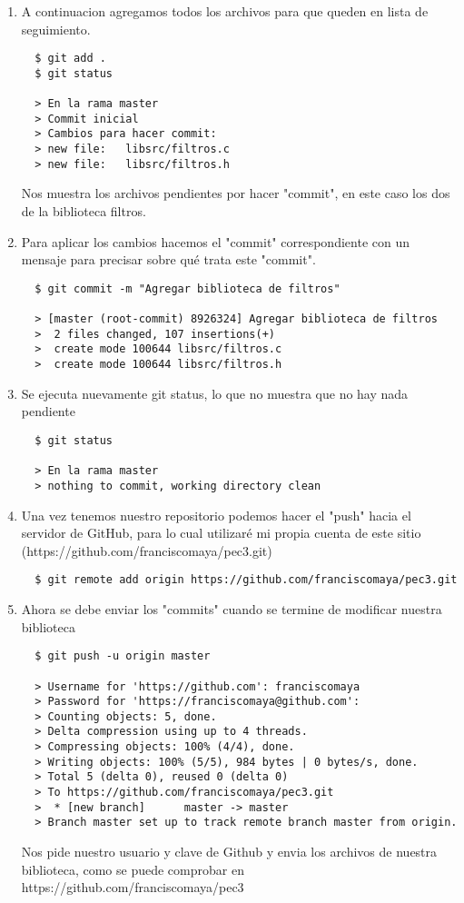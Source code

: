\documentclass{article}
\begin{document}
\begin{enumerate}
  \item A continuacion agregamos todos los archivos para que queden en lista de seguimiento.
  \begin{lstlisting}
  $ git add .
  $ git status

  > En la rama master
  > Commit inicial
  > Cambios para hacer commit:
  >	new file:   libsrc/filtros.c
  >	new file:   libsrc/filtros.h
  \end{lstlisting}
  Nos muestra los archivos pendientes por hacer "commit", en este caso los dos de la biblioteca filtros.

  \item Para aplicar los cambios hacemos el "commit" correspondiente con un mensaje para precisar sobre qué trata este "commit".
  \begin{lstlisting}
  $ git commit -m "Agregar biblioteca de filtros"

  > [master (root-commit) 8926324] Agregar biblioteca de filtros
  >  2 files changed, 107 insertions(+)
  >  create mode 100644 libsrc/filtros.c
  >  create mode 100644 libsrc/filtros.h
  \end{lstlisting}

  \item Se ejecuta nuevamente git status, lo que no muestra que no hay nada pendiente
  \begin{lstlisting}
  $ git status

  > En la rama master
  > nothing to commit, working directory clean
  \end{lstlisting}

  \item Una vez tenemos nuestro repositorio podemos hacer el "push" hacia el servidor de GitHub, para lo cual utilizaré mi propia cuenta de este sitio (https://github.com/franciscomaya/pec3.git)
  \begin{lstlisting}
  $ git remote add origin https://github.com/franciscomaya/pec3.git
  \end{lstlisting}

  \item Ahora se debe enviar los "commits" cuando se termine de modificar nuestra biblioteca
  \begin{lstlisting}
  $ git push -u origin master

  > Username for 'https://github.com': franciscomaya
  > Password for 'https://franciscomaya@github.com': 
  > Counting objects: 5, done.
  > Delta compression using up to 4 threads.
  > Compressing objects: 100% (4/4), done.
  > Writing objects: 100% (5/5), 984 bytes | 0 bytes/s, done.
  > Total 5 (delta 0), reused 0 (delta 0)
  > To https://github.com/franciscomaya/pec3.git
  >  * [new branch]      master -> master
  > Branch master set up to track remote branch master from origin.
  \end{lstlisting}
  Nos pide nuestro usuario y clave de Github y envia los archivos de nuestra biblioteca, como se puede comprobar en https://github.com/franciscomaya/pec3


\end{enumerate}
\end{document}
